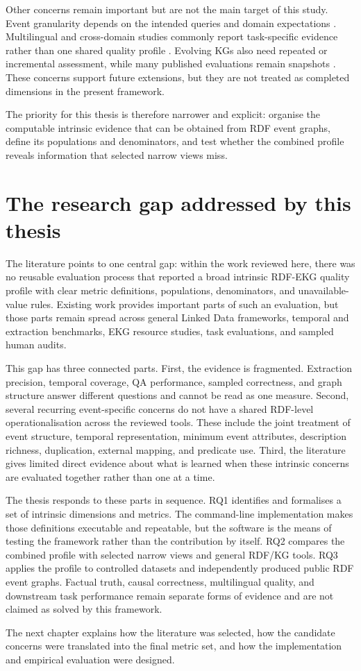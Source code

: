 Other concerns remain important but are not the main target of this study. Event granularity depends on the intended queries and domain expectations \citep{sem2011,eventkg2018}. Multilingual and cross-domain studies commonly report task-specific evidence rather than one shared quality profile \citep{oekg2023,eventqa2020,meci2022}. Evolving KGs also need repeated or incremental assessment, while many published evaluations remain snapshots \citep{kgevolution2023,efficienteval2019}. These concerns support future extensions, but they are not treated as completed dimensions in the present framework.

The priority for this thesis is therefore narrower and explicit: organise the computable intrinsic evidence that can be obtained from RDF event graphs, define its populations and denominators, and test whether the combined profile reveals information that selected narrow views miss.

\section{The research gap addressed by this thesis}

The literature points to one central gap: within the work reviewed here, there was no reusable evaluation process that reported a broad intrinsic RDF-EKG quality profile with clear metric definitions, populations, denominators, and unavailable-value rules. Existing work provides important parts of such an evaluation, but those parts remain spread across general Linked Data frameworks, temporal and extraction benchmarks, EKG resource studies, task evaluations, and sampled human audits.

This gap has three connected parts. First, the evidence is fragmented. Extraction precision, temporal coverage, QA performance, sampled correctness, and graph structure answer different questions and cannot be read as one measure. Second, several recurring event-specific concerns do not have a shared RDF-level operationalisation across the reviewed tools. These include the joint treatment of event structure, temporal representation, minimum event attributes, description richness, duplication, external mapping, and predicate use. Third, the literature gives limited direct evidence about what is learned when these intrinsic concerns are evaluated together rather than one at a time.

The thesis responds to these parts in sequence. RQ1 identifies and formalises a set of intrinsic dimensions and metrics. The command-line implementation makes those definitions executable and repeatable, but the software is the means of testing the framework rather than the contribution by itself. RQ2 compares the combined profile with selected narrow views and general RDF/KG tools. RQ3 applies the profile to controlled datasets and independently produced public RDF event graphs. Factual truth, causal correctness, multilingual quality, and downstream task performance remain separate forms of evidence and are not claimed as solved by this framework.

The next chapter explains how the literature was selected, how the candidate concerns were translated into the final metric set, and how the implementation and empirical evaluation were designed.
